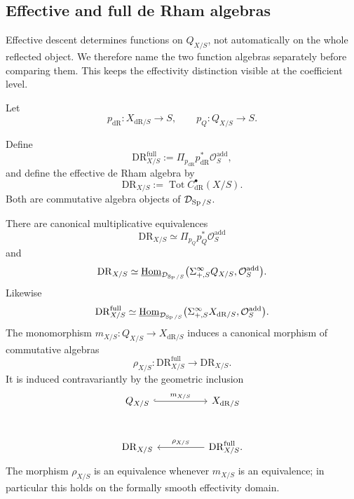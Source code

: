 \subsection{Effective and full de Rham algebras}
\label{sec:full-effective-de-Rham}

Effective descent determines functions on \(Q_{X/S}\), not automatically on
the whole reflected object. We therefore name the two function algebras
separately before comparing them. This keeps the effectivity distinction
visible at the coefficient level.

Let
\[
  p_{\mathrm{dR}}:X_{\mathrm{dR}/S}\to S,
  \qquad
  p_Q:Q_{X/S}\to S.
\]

\begin{definition}
Define
\[
  \mathrm{DR}^{\mathrm{full}}_{X/S}
  :=
  \Pi_{p_{\mathrm{dR}}}p_{\mathrm{dR}}^*\mathcal O_S^{\mathrm{add}},
\]
and define the effective de Rham algebra by
\[
  \mathrm{DR}_{X/S}
  :=
  \operatorname*{Tot}C^\bullet_{\mathrm{dR}}(X/S).
\]
Both are commutative algebra objects of \(\mathcal D_{\operatorname{Sp}/S}\).
\end{definition}

\begin{theorem}
\label{thm:effective-DR-functions}
There are canonical multiplicative equivalences
\[
  \mathrm{DR}_{X/S}
  \simeq
  \Pi_{p_Q} p_Q^*\mathcal O_S^{\mathrm{add}}
\]
and
\[
  \mathrm{DR}_{X/S}
  \simeq
  \underline{\operatorname{Hom}}_{\mathcal D_{\operatorname{Sp}/S}}
  \bigl(\Sigma^\infty_{+,S}Q_{X/S},\mathcal O_S^{\mathrm{add}}\bigr).
\]
Likewise
\[
  \mathrm{DR}^{\mathrm{full}}_{X/S}
  \simeq
  \underline{\operatorname{Hom}}_{\mathcal D_{\operatorname{Sp}/S}}
  \bigl(\Sigma^\infty_{+,S}X_{\mathrm{dR}/S},\mathcal O_S^{\mathrm{add}}\bigr).
\]
The monomorphism \(m_{X/S}:Q_{X/S}\to X_{\mathrm{dR}/S}\) induces a
canonical morphism of commutative algebras
\[
  \rho_{X/S}:
  \mathrm{DR}^{\mathrm{full}}_{X/S}
  \longrightarrow
  \mathrm{DR}_{X/S}.
\]
It is induced contravariantly by the geometric inclusion
\[
\begin{tikzcd}[column sep=huge,row sep=large]
  Q_{X/S} \arrow[r,hook,"m_{X/S}"]
  & X_{\mathrm{dR}/S}
  \\
  \mathrm{DR}_{X/S}
  & \mathrm{DR}^{\mathrm{full}}_{X/S}
      \arrow[l,"\rho_{X/S}"'].
\end{tikzcd}
\]
The morphism \(\rho_{X/S}\) is an equivalence whenever \(m_{X/S}\) is an
equivalence; in particular this holds on the formally smooth effectivity domain.
\end{theorem}


